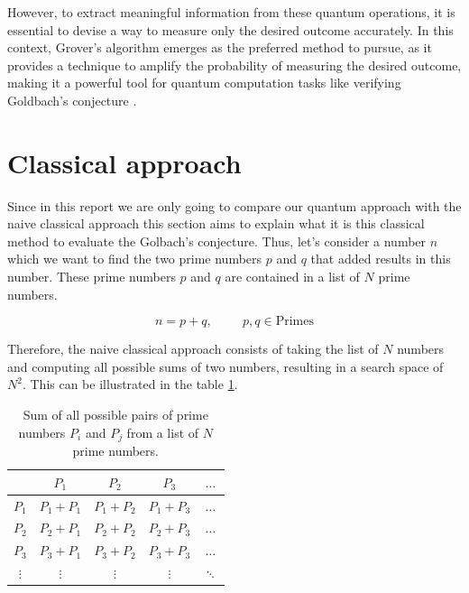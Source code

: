 \documentclass[aps,prapplied,longbibliography]{article}
\begin{document}
    However, to extract meaningful information from these quantum operations, it is essential to devise a way to measure only the desired outcome accurately. In this context, Grover's algorithm \cite{grover1996fast} emerges as the preferred method to pursue, as it provides a technique to amplify the probability of measuring the desired outcome, making it a powerful tool for quantum computation tasks like verifying Goldbach's conjecture \cite{latorre2013quantum, prudencio2013goldbach}.


    \section{Classical approach}

    Since in this report we are only going to compare our quantum approach with the naive classical approach this section aims to explain what it is this classical method to evaluate the Golbach's conjecture. Thus, let's consider a number $n$ which we want to find the two prime numbers  $p$ and $q$ that added results in this number. These prime numbers $p$ and $q$ are contained in a list of $N$ prime numbers.

    \begin{equation}
        n = p + q,\hspace{1cm}p,q\in\text{Primes}
    \end{equation}

    Therefore, the naive classical approach consists of taking the list of $N$ numbers and computing all possible sums of two numbers, resulting in a search space of $N^2$. This can be illustrated in the table \ref{tab:SumsClassical}.

    \begin{table}[h]
        \centering
        \caption{Sum of all possible pairs of prime numbers $P_i$ and $P_j$ from a list of $N$ prime numbers.}
        \label{tab:SumsClassical}
        \begin{tabular}{c|cccc}
            & $P_1$ & $P_2$ & $P_3$ & $\ldots$ \\
            \hline
        $P_1$ & $P_1 + P_1$ & $P_1 + P_2$ & $P_1 + P_3$ & $\ldots$ \\
        $P_2$ & $P_2 + P_1$ & $P_2 + P_2$ & $P_2 + P_3$ & $\ldots$ \\
        $P_3$ & $P_3 + P_1$ & $P_3 + P_2$ & $P_3 + P_3$ & $\ldots$ \\
        $\vdots$ & $\vdots$ & $\vdots$ & $\vdots$ & $\ddots$ \\
        \end{tabular}
    \end{table}
\end{document}
